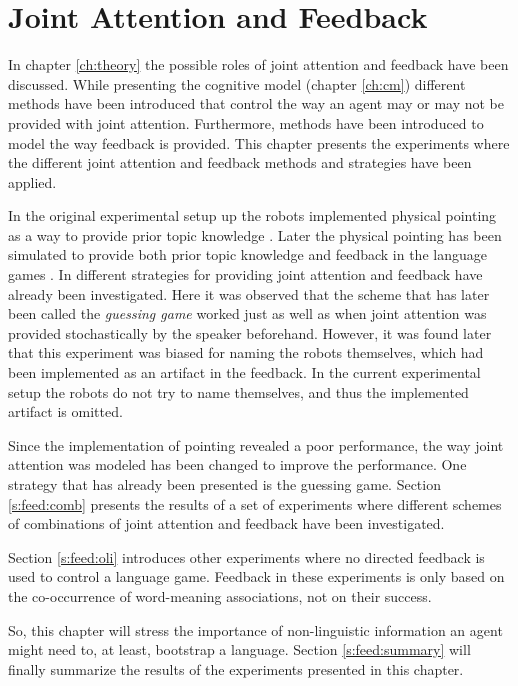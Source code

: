 \chapter{Joint Attention and Feedback}\label{ch:feed}

In chapter \ref{ch:theory} the possible roles of joint attention and feedback have been discussed. While presenting the cognitive model (chapter \ref{ch:cm}) different methods have been introduced that control the way an agent may or may not be provided with joint attention. Furthermore, methods have been introduced to model the way feedback is provided. This chapter presents the experiments where the different joint attention and feedback methods and strategies have been applied.

\p
In the original experimental setup up the robots implemented physical pointing as a way to provide prior topic knowledge \cite{steelsvogt:1997}. Later the physical pointing has been simulated to provide both prior topic knowledge and feedback in the language games \cite{vogt:1998b}. In \cite{vogt:1998c} different strategies for providing joint attention and feedback have already been investigated. Here it was observed that the scheme that has later been called the {\em guessing game} worked just as well as when joint attention was provided stochastically by the speaker beforehand. However, it was found later that this experiment was biased for naming the robots themselves, which had been implemented as an artifact in the feedback. In the current experimental setup the robots do not try to name themselves, and thus the implemented artifact is omitted. 

Since the implementation of pointing revealed a poor performance, the way joint attention was modeled has been changed to improve the performance. One strategy that has already been presented is the guessing game. Section \ref{s:feed:comb} presents the results of a set of experiments where different schemes of combinations of joint attention and feedback have been investigated. 

Section \ref{s:feed:oli} introduces other experiments where no directed feedback is used to control a language game. Feedback in these experiments is only based on the co-occurrence of word-meaning associations, not on their success.

\p
So, this chapter will stress the importance of non-linguistic information an agent might need to, at least, bootstrap a language. Section \ref{s:feed:summary} will finally summarize the results of the experiments presented in this chapter.


